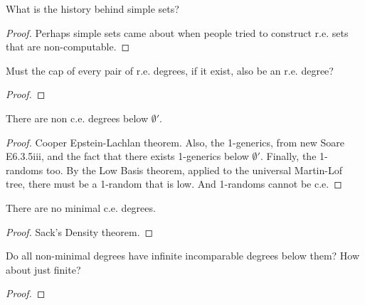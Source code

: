 \begin{theorem}
  What is the history behind simple sets?
\end{theorem}
\begin{proof}
  Perhaps simple sets came about when people tried to construct
  r.e. sets that are non-computable. 
\end{proof}

\begin{question}
  Must the cap of every pair of r.e. degrees, if it exist, also be an
  r.e. degree?
\end{question}
\begin{proof}
\end{proof}

\begin{theorem}
  There are non c.e. degrees below $\emptyset'$.
\end{theorem}
\begin{proof}
  Cooper Epstein-Lachlan theorem. Also, the 1-generics, from new Soare
  E6.3.5iii, and the fact that there exists 1-generics below
  $\emptyset'$. Finally, the 1-randoms too. By the Low Basis theorem,
  applied to the universal Martin-Lof tree, there must be a 1-random
  that is low. And 1-randoms cannot be c.e.
\end{proof}

\begin{theorem}
  There are no minimal c.e. degrees.
\end{theorem}
\begin{proof}
  Sack's Density theorem.
\end{proof}

\begin{question}
  Do all non-minimal degrees have infinite incomparable degrees below
  them? How about just finite?
\end{question}
\begin{proof}
\end{proof}
